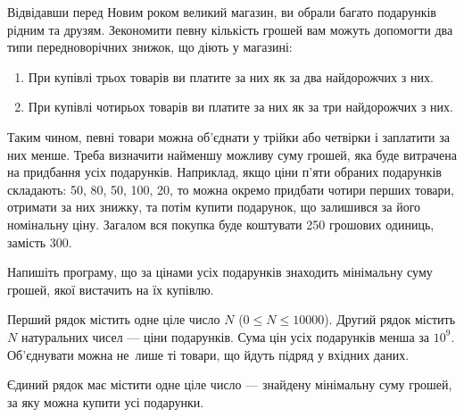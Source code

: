 ﻿Відвідавши перед Новим роком великий магазин, ви обрали багато подарунків рідним та друзям. Зекономити певну кількість грошей вам можуть допомогти два типи передноворічних знижок, що діють у магазині:
\begin{enumerate}
\item
При купівлі трьох товарів ви платите за них як за два найдорожчих з них.
\item
При купівлі чотирьох товарів ви платите за них як за три найдорожчих з них.
\end{enumerate}

Таким чином, певні товари можна об’єднати у трійки або четвірки і заплатити за них менше. Треба визначити найменшу можливу суму грошей, яка буде витрачена на придбання усіх подарунків. Наприклад, якщо ціни п’яти обраних подарунків складають: 50, 80, 50, 100, 20, то можна окремо придбати чотири перших товари, отримати за них знижку, та потім купити подарунок, що залишився за його номінальну ціну. Загалом вся покупка буде коштувати 250 грошових одиниць, замість 300.

Напишіть програму, що за цінами усіх подарунків знаходить мінімальну суму грошей, якої вистачить на їх купівлю.

\InputFile
Перший рядок містить одне ціле число $N$ ($0\leqslant N\leqslant 10000$). Другий рядок містить $N$ натуральних чисел --- ціни подарунків. Сума цін усіх подарунків менша за $10^9$. Об’єднувати можна не~лише ті товари, що йдуть підряд у вхідних даних.

\OutputFile
Єдиний рядок має містити одне ціле число --- знайдену мінімальну суму грошей, за яку можна купити усі подарунки.

\Examples
\begin{example}
\end{example}

